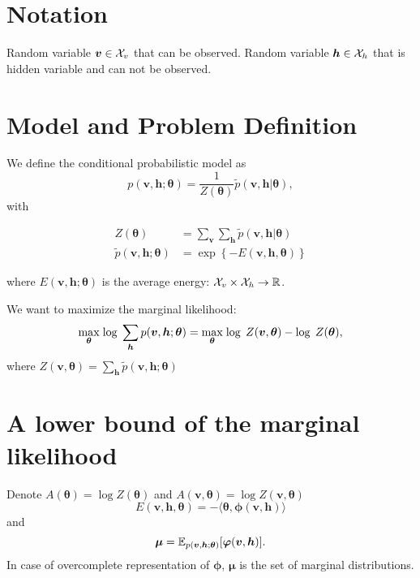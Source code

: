 \section{Notation}
Random variable $\bm{v} \in \mathcal{X}_v$ that can be observed.
Random variable $\bm{h} \in \mathcal{X}_h$ that is hidden variable and can not be observed.

\section{Model and Problem Definition}

We define the conditional probabilistic model as
\begin{equation}\label{eq:model}
  p(\bm{v}, \bm{h} ; \bm{\theta}) = \frac{1}{Z(\bm{\theta})} \tilde{p}(\bm{v}, \bm{h} |\bm{\theta}),
\end{equation}
with

\begin{align}
  Z(\bm{\theta}) & = \sum_{\bm{v}}\sum_{\bm{h}} \tilde{p}(\bm{v}, \bm{h} |\bm{\theta})\\
  \tilde{p}(\bm{v}, \bm{h} ; \bm{\theta}) & = \exp\left\{-E(\bm{v}, \bm{h}, \bm{\theta})\right\}
\end{align}

where $E(\bm{v}, \bm{h}; \bm{\theta})$ is the average energy: $\mathcal{X}_v \times \mathcal{X}_h \rightarrow \mathbb{R}$.

We want to maximize the marginal likelihood:
\begin{equation}
  \underset{\bm{\theta}}{\max}\;{\log\;\sum_{\bm{h}}p(\bm{v}, \bm{h}; \bm{\theta})} = \underset{\bm{\theta}}{\max}\;{\log\;Z(\bm{v}, \bm{\theta})} - \log\; Z(\bm{\theta}), 
\end{equation}
where $Z(\bm{v}, \bm{\theta})  = \sum_{\bm{h}}\tilde{p}(\bm{v}, \bm{h} ; \bm{\theta})$
\section{A lower bound of the marginal likelihood}
Denote $A(\bm{\theta}) = \log{Z(\bm{\theta})}$ and $A(\bm{v}, \bm{\theta}) = \log{Z(\bm{v}, \bm{\theta})}$
\begin{equation}
  E(\bm{v}, \bm{h}, \bm{\theta}) = - \langle  \bm{\theta}, \bm{\phi}(\bm{v}, \bm{h})\rangle
\end{equation}
and
\begin{equation}
  \bm{\mu} = \mathbb{E}_{p(\bm{v}, \bm{h}; \bm{\theta})}[\bm{\varphi}(\bm{v}, \bm{h})].
\end{equation}
In case of overcomplete representation of $\bm{\phi}$, $\bm{\mu}$ is the set of marginal distributions.

